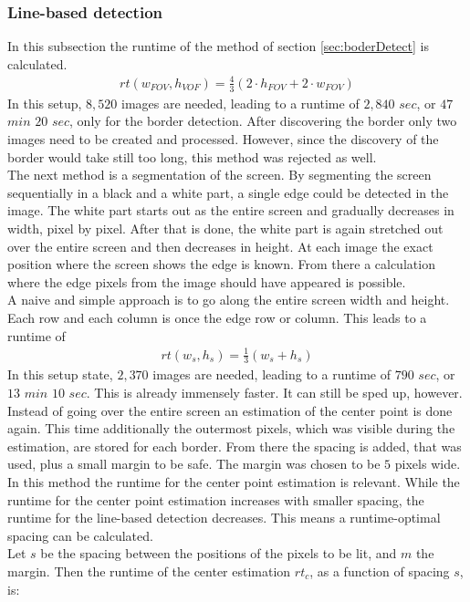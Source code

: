 \documentclass[journal,final,a4paper,twoside]{PS}
\begin{document}
\subsubsection{Line-based detection} 
\label{sec:linebased}
In this subsection the runtime of the method of section \ref{sec:boderDetect} is calculated.
\begin{align}
rt(w_{FOV}, h_{VOF}) = \frac{4}{3} (2 \cdot h_{FOV} + 2 \cdot w_{FOV})
\end{align}
In this setup, $8,520$ images are needed, leading to a runtime of $2,840$ $sec$, or $47$ $min$ $20$ $sec$, only for the border detection. After discovering the border only two images need to be created and processed. However, since the discovery of the border would take still too long, this method was rejected as well.\\
The next method is a segmentation of the screen. By segmenting the screen sequentially in a black and a white part, a single edge could be detected in the image. The white part starts out as the entire screen and gradually decreases in width, pixel by pixel. After that is done, the white part is again stretched out over the entire screen and then decreases in height. At each image the exact position where the screen shows the edge is known. From there a calculation where the edge pixels from the image should have appeared is possible.\\
A naive and simple approach is to go along the entire screen width and height. Each row and each column is once the edge row or column. This leads to a runtime of
\begin{align}
rt(w_s, h_s) = \frac{1}{3} (w_s + h_s)
\end{align}
In this setup state,  $2,370$ images are needed, leading to a runtime of $790$ $sec$, or $13$ $min$ $10$ $sec$.  This is already immensely faster. It can still be sped up, however.\\
Instead of going over the entire screen an estimation of the center point is done again. This time additionally the outermost pixels, which was visible during the estimation, are stored for each border. From there the spacing is added, that was used, plus a small margin to be safe. The margin was chosen to be $5$ pixels wide. In this method the runtime for the center point estimation is relevant. While the runtime for the center point estimation increases with smaller spacing, the runtime for the line-based detection decreases. This means a runtime-optimal spacing can be calculated.\\
Let $s$ be the spacing between the positions of the pixels to be lit, and $m$ the margin. Then the runtime of the center estimation $rt_c$, as a function of spacing $s$, is:
\end{document}
